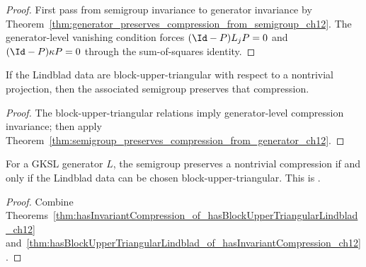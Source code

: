 \begin{proof}
    \leanok
    First pass from semigroup invariance to generator invariance by
    Theorem~\ref{thm:generator_preserves_compression_from_semigroup_ch12}.
    The generator-level vanishing condition forces $(\Id-P)L_jP=0$ and
    $(\Id-P)\kappa P=0$ through the sum-of-squares identity.
\end{proof}

\begin{theorem}
    \label{thm:hasInvariantCompression_of_hasBlockUpperTriangularLindblad_ch12}
    \leanok
    If the Lindblad data are block-upper-triangular with respect to a nontrivial projection,
    then the associated semigroup preserves that compression.
\end{theorem}

\begin{proof}
    \leanok
    The block-upper-triangular relations imply generator-level compression invariance; then apply
    Theorem~\ref{thm:semigroup_preserves_compression_from_generator_ch12}.
\end{proof}

\begin{theorem}
    \label{thm:wolf_prop_7_6_three_iff_four}
    \leanok
    For a GKSL generator $L$, the semigroup preserves a nontrivial
    compression if and only if the Lindblad data can be chosen
    block-upper-triangular.
    This is \cite[Proposition~7.6, (3)$\Leftrightarrow$(4)]{Wolf2012Quantum}.
\end{theorem}

\begin{proof}\leanok
    Combine Theorems~\ref{thm:hasInvariantCompression_of_hasBlockUpperTriangularLindblad_ch12}
    and~\ref{thm:hasBlockUpperTriangularLindblad_of_hasInvariantCompression_ch12}.
\end{proof}

